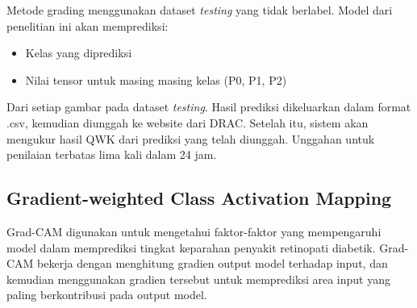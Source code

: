 Metode grading menggunakan dataset \emph{testing} yang tidak berlabel. Model dari penelitian ini akan memprediksi:
\begin{itemize}
	\item Kelas yang diprediksi
	\item Nilai tensor untuk masing masing kelas (P0, P1, P2)
\end{itemize}
Dari setiap gambar pada dataset \emph{testing}. Hasil prediksi dikeluarkan dalam format .csv, kemudian diunggah ke website dari DRAC.
Setelah itu, sistem akan mengukur hasil QWK dari prediksi yang telah diunggah. Unggahan untuk penilaian terbatas lima kali dalam 24 jam.

\subsection{Gradient-weighted Class Activation Mapping}
\label{sec:327}
Grad-CAM digunakan untuk mengetahui faktor-faktor yang mempengaruhi model dalam memprediksi tingkat keparahan penyakit retinopati diabetik. Grad-CAM bekerja dengan menghitung gradien output model terhadap input, dan kemudian menggunakan gradien tersebut untuk memprediksi area input yang paling berkontribusi pada output model.

